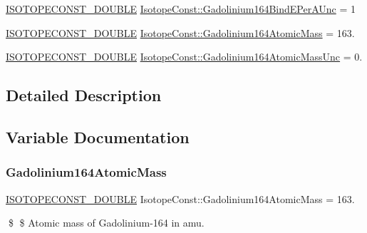 \begin{DoxyCompactItemize}
\mbox{\hyperlink{group___isotope_const-_macros_ga8f45a7272ce02c0b4c65c44636ed719a}{I\+S\+O\+T\+O\+P\+E\+C\+O\+N\+S\+T\+\_\+\+D\+O\+U\+B\+LE}} \mbox{\hyperlink{group___isotope_const-_gadolinium-_gd164_ga633c54abafc215e78e2a8c31bb763d20}{Isotope\+Const\+::\+Gadolinium164\+Bind\+E\+Per\+A\+Unc}} = 1
\item 
\mbox{\hyperlink{group___isotope_const-_macros_ga8f45a7272ce02c0b4c65c44636ed719a}{I\+S\+O\+T\+O\+P\+E\+C\+O\+N\+S\+T\+\_\+\+D\+O\+U\+B\+LE}} \mbox{\hyperlink{group___isotope_const-_gadolinium-_gd164_ga7c96fbc17f99e575a2f5c8ee716e3c3d}{Isotope\+Const\+::\+Gadolinium164\+Atomic\+Mass}} = 163.
\item 
\mbox{\hyperlink{group___isotope_const-_macros_ga8f45a7272ce02c0b4c65c44636ed719a}{I\+S\+O\+T\+O\+P\+E\+C\+O\+N\+S\+T\+\_\+\+D\+O\+U\+B\+LE}} \mbox{\hyperlink{group___isotope_const-_gadolinium-_gd164_ga63dca1abf1f868c3604e75d7219ab87b}{Isotope\+Const\+::\+Gadolinium164\+Atomic\+Mass\+Unc}} = 0.
\end{DoxyCompactItemize}


\subsection{Detailed Description}


\subsection{Variable Documentation}
\mbox{\label{group___isotope_const-_gadolinium-_gd164_ga7c96fbc17f99e575a2f5c8ee716e3c3d}} 
\subsubsection{\texorpdfstring{Gadolinium164\+Atomic\+Mass}{Gadolinium164AtomicMass}}
{\footnotesize\ttfamily \mbox{\hyperlink{group___isotope_const-_macros_ga8f45a7272ce02c0b4c65c44636ed719a}{I\+S\+O\+T\+O\+P\+E\+C\+O\+N\+S\+T\+\_\+\+D\+O\+U\+B\+LE}} Isotope\+Const\+::\+Gadolinium164\+Atomic\+Mass = 163.}

\$ \$ Atomic mass of Gadolinium-\/164 in amu. \mbox{\label{group___isotope_const-_gadolinium-_gd164_ga63dca1abf1f868c3604e75d7219ab87b}} 
